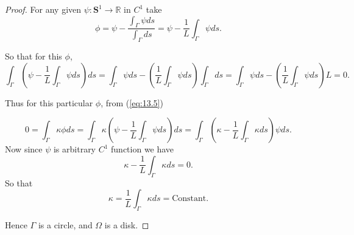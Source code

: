 \documentclass[oneside]{book}
\begin{document}
\begin{proof}
		For any given $\psi: \mathbf{S}^{1} \rightarrow \mathbb{R}$ in $C^{1}$ take $$\phi = \psi - \frac{\int_{\Gamma} \psi d s }{ \int_{\Gamma} d s}
		= \psi-\frac{1}{L} \int_{\Gamma} \psi d s.$$
		
		
		So that for this $\phi$, 
		$$\int_{\Gamma} \left(\psi-\frac{1}{L} \int_{\Gamma} \psi d s\right) d s = 
		\int_{\Gamma}\psi ds -  \left(\frac{1}{L} \int_{\Gamma} \psi d s\right)  \int_{\Gamma} d s  = \int_{\Gamma}\psi ds -  \left(\frac{1}{L} \int_{\Gamma} \psi ds \right)
		L  =  0.$$
		
		Thus for this particular $\phi$, from (\ref{eq:13.5})
		
		$$0 =  \int_{\Gamma} \kappa \phi d s = \int_{\Gamma} \kappa\left(\psi-\frac{1}{L} \int_{\Gamma} \psi d s\right) d s = \int_{\Gamma} \left(\kappa - \frac{1}{L} \int_{\Gamma} \kappa d s\right) \psi d s.$$
		Now since $\psi$ is arbitrary $C^{1}$ function we have 
		$$ \kappa - \frac{1}{L} \int_{\Gamma} \kappa d s = 0. $$
		So that
		$$\kappa =
		\frac{1}{L} \int_{\Gamma}\kappa  ds = \text{Constant}. $$
		
		Hence $\Gamma$ is a circle, and $\Omega$ is a disk.
		
		
		
	\end{proof} 
	
\end{document}
